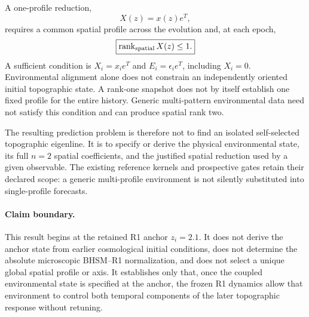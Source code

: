 A one-profile reduction,
\begin{equation}
X(z)=x(z)e^T ,
\end{equation}
requires a common spatial profile across the evolution and, at each epoch,
\begin{equation}
\boxed{
\operatorname{rank}_{\rm spatial}X(z)\le1.
}
\end{equation}
A sufficient condition is $X_i=x_i e^T$ and $E_i=\epsilon_i e^T$, including
$X_i=0$. Environmental alignment alone does not constrain an independently
oriented initial topographic state. A rank-one snapshot does not by itself
establish one fixed profile for the entire history.
Generic multi-pattern environmental data need not satisfy this condition and
can produce spatial rank two.

The resulting prediction problem is therefore not to find an isolated
self-selected topographic eigenline.  It is to specify or derive the physical
environmental state, its full $n=2$ spatial coefficients, and the justified
spatial reduction used by a given observable. The existing reference kernels
and prospective gates retain their declared scope: a generic multi-profile
environment is not silently substituted into single-profile forecasts.

\paragraph{Claim boundary.}
This result begins at the retained R1 anchor $z_i=2.1$.  It does not derive the
anchor state from earlier cosmological initial conditions, does not determine
the absolute microscopic BHSM--R1 normalization, and does not select a unique
global spatial profile or axis.  It establishes only that, once the coupled
environmental state is specified at the anchor, the frozen R1 dynamics allow
that environment to control both temporal components of the later
topographic response without retuning.
